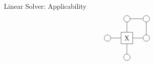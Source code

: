\begin{frame}{Linear Solver: Applicability}
    \begin{equation}
        \vcenter{\hbox{  \begin{tikzpicture}[baseline=0.5]

                    \def \legLength { 0.8}
                    \def \radius {0.1}

                    \pgfmathsetmacro{\step}{2*\radius+ \legLength} %
                    \pgfmathsetmacro{\legpos}{\radius+\legLength} %

                    \node[draw, circle,radius=\radius] (L0) at (-1,0) {};

                    \draw (-0.3,0.3) -- (0.3,0.3) -- (0.3,-0.3) -- (-0.3,-0.3) -- cycle;

                    \node[draw, circle,radius=\radius] (R0) at (1,0) {};
                    \node[draw, circle,radius=\radius] (R1) at (1,1) {};

                    \node[draw, circle,radius=\radius] (U) at (0,1) {};
                    \node[draw, circle,radius=\radius] (D) at (0,-1) {};

                    \draw (R0) --   (R1);

                    \draw (L0) --   (-0.3,0);

                    \draw (R0) --   (0.3,0);
                    \draw (U) --   (0,0.3);
                    \draw (D) --   (0,-0.3);
                    \draw (R1) --   (U);

                    \node[draw=none] (C0) at (0,0) {X};
                \end{tikzpicture} }}
    \end{equation}
\end{frame}

\def \figa { \vcenter{\hbox{ \pepob{5}{3}{{
                        "","","","",
                        "","","","",
                        "","","",""}}{{
                        "","",
                        "","",
                        "","",
                        "","",
                        "",""}}{{
                        1,1,1,1,1,
                        1,0,0,0,1,
                        1,0,0,0,1}} } }}

